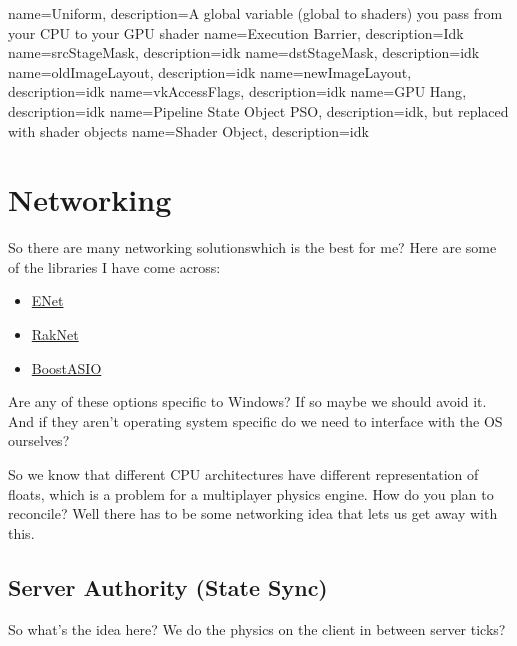 \documentclass{article}
\begin{document}
{
name={Uniform},
description={A global variable (global to shaders) you pass from your
CPU to your GPU shader}
}
{
name={Execution Barrier},
description={Idk}
}
{
name={srcStageMask},
description={idk}
}
{
name={dstStageMask},
description={idk}
}
{
name={oldImageLayout},
description={idk}
}
{
name={newImageLayout},
description={idk}
}
{
name={vkAccessFlags},
description={idk}
}
{
name={GPU Hang},
description={idk}
}
{
name={Pipeline State Object PSO},
description={idk, but replaced with shader objects}
}
{
name={Shader Object},
description={idk}
}

\printglossaries
{}
\clearpage

\section*{Networking}
\par So there are many networking solutions\textemdash which is the
best for me? Here are some of the libraries I have come across:
\begin{itemize}
\item \href{http://enet.bespin.org/}{ENet}
\item \href{http://www.jenkinssoftware.com/platforms.html}{RakNet}
\item
  \href{https://www.boost.org/doc/libs/latest/doc/html/boost_asio.html}{BoostASIO}
\end{itemize}

\par Are any of these options specific to Windows? If so maybe we
should avoid it. And if they aren't operating system specific do we
need to interface with the OS ourselves?

\par So we know that different CPU architectures have different
representation of floats, which is a problem for a multiplayer
physics engine. How do you plan to reconcile? Well there has to be
some networking idea that lets us get away with this.

\subsection*{Server Authority (State
Sync)}
\par So what's the idea here? We do the physics on the client in
between server ticks?
\end{document}
